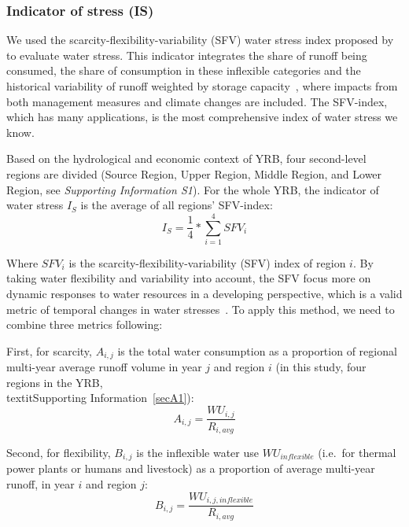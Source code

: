 	\subsubsection{Indicator of stress (IS)}
	We used the scarcity-flexibility-variability (SFV) water stress index proposed by  to evaluate water stress.
	This indicator integrates the share of runoff being consumed, the share of consumption in these inflexible categories and the historical variability of runoff weighted by storage capacity~\cite{qin2019}, where impacts from both management measures and climate changes are included.
	The SFV-index, which has many applications, is the most comprehensive index of water stress we know. %

	Based on the hydrological and economic context of YRB, four second-level regions are divided (Source Region, Upper Region, Middle Region, and Lower Region, see \textit{Supporting Information S1}).
	For the whole YRB, the indicator of water stress $I_S$ is the average of all regions' SFV-index:
	\begin{equation}
		I_S = \frac{1}{4} * \sum_{i=1}^4 SFV_{i}
	\end{equation}

	Where $SFV_i$ is the scarcity-flexibility-variability (SFV) index of region $i$. By taking water flexibility and variability into account, the SFV focus more on dynamic responses to water resources in a developing perspective, which is a valid metric of temporal changes in water stresses~\cite{qin2019}. To apply this method, we need to combine three metrics following:

	First, for scarcity, $A_{i, j}$ is the total water consumption as a proportion of regional multi-year average runoff volume in year $j$ and region $i$ (in this study, four regions in the YRB, \\textit{Supporting Information}~\ref{secA1}):
	\begin{equation}
		A_{i, j} = \frac{WU_{i,j}}{R_{i, avg}}
	\end{equation}

	Second, for flexibility, $B_{i, j}$ is the inflexible water use $WU_{inflexible}$ (i.e.\ for thermal power plants or humans and livestock) as a proportion of average multi-year runoff, in year $i$ and region $j$:
	\begin{equation}
		B_{i, j} = \frac{WU_{i, j, inflexible}}{R_{i, avg}}
	\end{equation}

